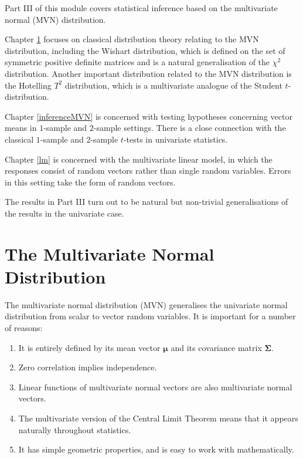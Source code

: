 \documentclass[]{book}
\providecommand{\tightlist}{%
  \setlength{\itemsep}{0pt}\setlength{\parskip}{0pt}}
\theoremstyle{definition}
\theoremstyle{definition}
\theoremstyle{definition}
\theoremstyle{remark}
\begin{document}
Part III of this module covers statistical inference based on the multivariate normal (MVN) distribution.

Chapter \ref{multinormal} focuses on classical distribution theory relating to the MVN distribution, including the Wishart distribution, which is defined on the set of symmetric positive definite matrices and is a natural generalisation of the \(\chi^2\) distribution. Another important distribution related to the MVN distribution is the Hotelling \(T^2\) distribution, which is a multivariate analogue of the Student \(t\)-distribution.

Chapter \ref{inferenceMVN} is concerned with testing hypotheses concerning vector means in \(1\)-sample and \(2\)-sample settings. There is a close connection with the classical \(1\)-sample and \(2\)-sample \(t\)-tests in univariate statistics.

Chapter \ref{lm} is concerned with the multivariate linear model, in which the responses consist of random vectors rather than single random variables. Errors in this setting take the form of random vectors.

The results in Part III turn out to be natural but non-trivial generalisations of the results in the univariate case.

\hypertarget{multinormal}{%
\chapter{The Multivariate Normal Distribution}\label{multinormal}}

The multivariate normal distribution (MVN) generalises the univariate normal distribution from scalar to vector random variables. It is important for a number of reasons:

\begin{enumerate}
\def\labelenumi{\arabic{enumi}.}
\tightlist
\item
  It is entirely defined by its mean vector \(\boldsymbol \mu\) and its covariance matrix \(\boldsymbol \Sigma\).
\item
  Zero correlation implies independence.
\item
  Linear functions of multivariate normal vectors are also multivariate normal vectors.
\item
  The multivariate version of the Central Limit Theorem means that it appears naturally throughout statistics.
\item
  It has simple geometric properties, and is easy to work with mathematically.
\end{enumerate}
\end{document}
